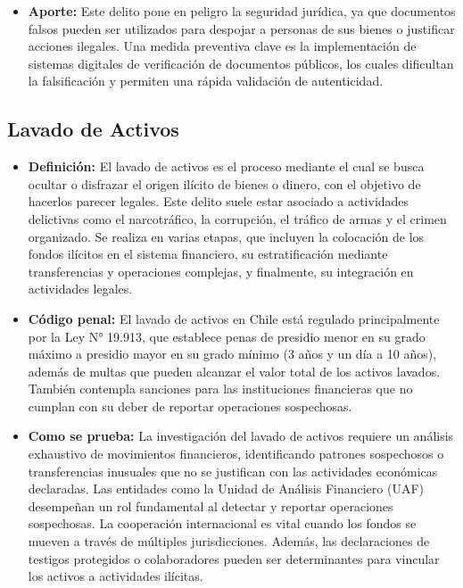 \documentclass[letter,12pt]{article}
\begin{document}
\begin{itemize}
		\item \textbf{Aporte: }Este delito pone en peligro la seguridad jurídica, ya que documentos falsos pueden ser utilizados para despojar a personas de sus bienes o justificar acciones ilegales. Una medida preventiva clave es la implementación de sistemas digitales de verificación de documentos públicos, los cuales dificultan la falsificación y permiten una rápida validación de autenticidad.\\
	\end{itemize}
	
	\subsection{Lavado de Activos}
	\begin{itemize}
		\item \textbf{Definición: }El lavado de activos es el proceso mediante el cual se busca ocultar o disfrazar el origen ilícito de bienes o dinero, con el objetivo de hacerlos parecer legales. Este delito suele estar asociado a actividades delictivas como el narcotráfico, la corrupción, el tráfico de armas y el crimen organizado. Se realiza en varias etapas, que incluyen la colocación de los fondos ilícitos en el sistema financiero, su estratificación mediante transferencias y operaciones complejas, y finalmente, su integración en actividades legales.\\
		\newpage
		
		\item \textbf{Código penal: }El lavado de activos en Chile está regulado principalmente por la Ley N° 19.913, que establece penas de presidio menor en su grado máximo a presidio mayor en su grado mínimo (3 años y un día a 10 años), además de multas que pueden alcanzar el valor total de los activos lavados. También contempla sanciones para las instituciones financieras que no cumplan con su deber de reportar operaciones sospechosas.\\
		
		\item \textbf{Como se prueba: }La investigación del lavado de activos requiere un análisis exhaustivo de movimientos financieros, identificando patrones sospechosos o transferencias inusuales que no se justifican con las actividades económicas declaradas. Las entidades como la Unidad de Análisis Financiero (UAF) desempeñan un rol fundamental al detectar y reportar operaciones sospechosas. La cooperación internacional es vital cuando los fondos se mueven a través de múltiples jurisdicciones. Además, las declaraciones de testigos protegidos o colaboradores pueden ser determinantes para vincular los activos a actividades ilícitas.\\
		

\end{itemize}
\end{document}

